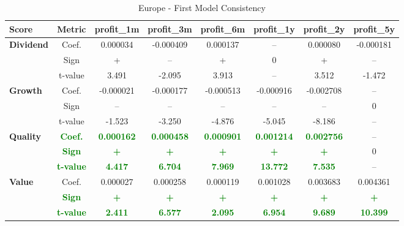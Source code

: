 \documentclass[11pt,english,a4paper,hidelinks]{book}
\begin{document}
\begin{table}[H]
    \centering
    \caption{Europe - First Model Consistency}
    \begin{tabular}{lccccccc}
        \toprule
        \textbf{Score} & \textbf{Metric} & \textbf{profit\_1m} & \textbf{profit\_3m} & \textbf{profit\_6m} & \textbf{profit\_1y} & \textbf{profit\_2y} & \textbf{profit\_5y} \\
        \midrule
        \multirow{3}{*}{\textbf{Dividend}} 
            & Coef. & 0.000034 & -0.000409 & 0.000137 & -- & 0.000080 & -0.000181 \\
            & Sign & + & – & + & 0 & + & – \\
            & t-value & 3.491 & -2.095 & 3.913 & -- & 3.512 & -1.472 \\
        \midrule
        \multirow{3}{*}{\textbf{Growth}} 
            & Coef. & -0.000021 & -0.000177 & -0.000513 & -0.000916 & -0.002708 & -- \\
            & Sign & – & – & – & – & – & 0 \\
            & t-value & -1.523 & -3.250 & -4.876 & -5.045 & -8.186 & -- \\
        \midrule
        \multirow{3}{*}{\textbf{Quality}} 
            & \textbf{\textcolor{green}{Coef.}} & \textbf{\textcolor{green}{0.000162}} & \textbf{\textcolor{green}{0.000458}} & \textbf{\textcolor{green}{0.000901}} & \textbf{\textcolor{green}{0.001214}} & \textbf{\textcolor{green}{0.002756}} & -- \\
            & \textbf{\textcolor{green}{Sign}} & \textbf{\textcolor{green}{+}} & \textbf{\textcolor{green}{+}} & \textbf{\textcolor{green}{+}} & \textbf{\textcolor{green}{+}} & \textbf{\textcolor{green}{+}} & 0 \\
            & \textbf{\textcolor{green}{t-value}} & \textbf{\textcolor{green}{4.417}} & \textbf{\textcolor{green}{6.704}} & \textbf{\textcolor{green}{7.969}} & \textbf{\textcolor{green}{13.772}} & \textbf{\textcolor{green}{7.535}} & -- \\
        \midrule
        \multirow{3}{*}{\textbf{Value}} 
            & Coef. & 0.000027 & 0.000258 & 0.000119 & 0.001028 & 0.003683 & 0.004361 \\
            & \textbf{\textcolor{green}{Sign}} & \textbf{\textcolor{green}{+}} & \textbf{\textcolor{green}{+}} & \textbf{\textcolor{green}{+}} & \textbf{\textcolor{green}{+}} & \textbf{\textcolor{green}{+}} & \textbf{\textcolor{green}{+}} \\
            & \textbf{\textcolor{green}{t-value}} & \textbf{\textcolor{green}{2.411}} & \textbf{\textcolor{green}{6.577}} & \textbf{\textcolor{green}{2.095}} & \textbf{\textcolor{green}{6.954}} & \textbf{\textcolor{green}{9.689}} & \textbf{\textcolor{green}{10.399}} \\
        \bottomrule
    \end{tabular}
    \label{tab:eu_first_model_consistency}
\end{table}
\end{document}
